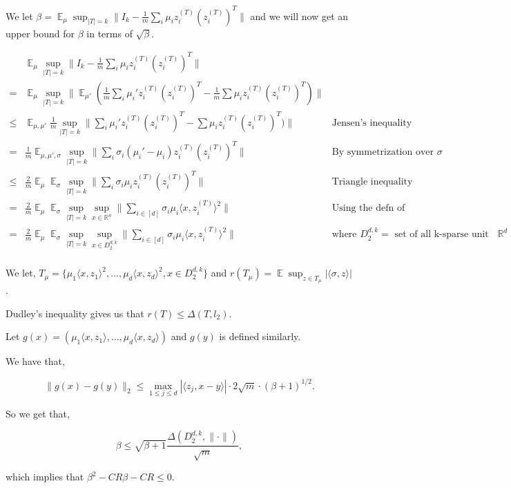 \documentclass[11pt]{article}
\DeclareMathOperator*{\E}{\mathbb{E}}
\newcommand{\inprod}[1]{\langle #1 \rangle}
\newcommand{\R}{\mathbb{R}}
\begin{document}
We let $\beta = \E_\mu \sup_{|T| = k} \| I_k - \frac{1}{m} \sum_i \mu_i z_i^{(T)} (z_i^{(T)})^T \| $ and we will now get an upper bound for $\beta$ in terms of $\sqrt{\beta}$.


\begin{align*}
&\E_\mu \sup_{|T| = k} \| I_k - \frac{1}{m} \sum_i \mu_i z_i^{(T)} (z_i^{(T)})^T \| \\
= &\E_\mu \sup_{|T| = k} \| \E_{\mu'}(\frac{1}{m} \sum_i \mu_i' z_i^{(T)} (z_i^{(T)})^T - \frac{1}{m} \sum \mu_i z_i^{(T)} (z_i^{(T)})^T) \| \\
\leq &\E_{\mu,\mu'}\frac{1}{m} \sup_{|T| = k} \|  \sum_i \mu_i' z_i^{(T)} (z_i^{(T)})^T - \sum \mu_i z_i^{(T)} (z_i^{(T)})^T) \|  &\text{Jensen's inequality}\\
= &\frac{1}{m}\E_{\mu,\mu',\sigma} \sup_{|T| = k} \|  \sum_i \sigma_i(\mu_i' - \mu_i) z_i^{(T)} (z_i^{(T)})^T \|  &\text{By symmetrization over }\sigma\\
\leq &\frac{2}{m}\E_{\mu} \E_{\sigma} \sup_{|T| = k} \|  \sum_i \sigma_i \mu_i z_i^{(T)} (z_i^{(T)})^T \|  &\text{Triangle inequality}\\
= &\frac{2}{m}\E_{\mu} \E_{\sigma} \sup_{|T| = k}\sup_{x \in \R^n} \|  \sum_{i \in [d]} \sigma_i \mu_i \inprod{x,z_i^{(T)}}^2 \|  &\text{Using the defn of operator norm of a matrix}\\
= &\frac{2}{m}\E_{\mu} \E_{\sigma} \sup_{|T| = k}\sup_{x \in D_2^{d,k}} \|  \sum_{i \in [d]} \sigma_i \mu_i \inprod{x,z_i^{(T)}}^2 \|  &\text{where } D_2^{d,k} = \text{ set of all k-sparse unit vectors in } \R^d \\
\end{align*}

We let, $T_{\mu} = \{ \mu_1 \inprod{x,z_1}^2,\ldots, \mu_d \inprod{x,z_d}^2, x \in D_2^{d,k}\}$ and $r(T_\mu) = \E \sup_{z \in T_\mu} |\inprod{\sigma,z} |$.

Dudley's inequality gives us that $r(T) \leq \Delta(T,l_2)$.

Let $g(x) = (\mu_1\inprod{x,z_1},\ldots,\mu_d\inprod{x,z_d})$ and $g(y)$ is defined similarly.
	
We have that,

$$\|g(x) - g(y)\|_2 \leq \max_{1 \leq j \leq d} |\inprod{z_j,x-y}|\cdot2\sqrt{m}\cdot(\beta + 1)^{1/2}.$$	

So we get that,

$$\beta \leq \sqrt{\beta + 1} \frac{\Delta(D_2^{d,k}, \|\cdot\|)}{\sqrt{m}},$$

which implies that $\beta^2 - CR\beta -CR \leq 0$.
\end{document}

